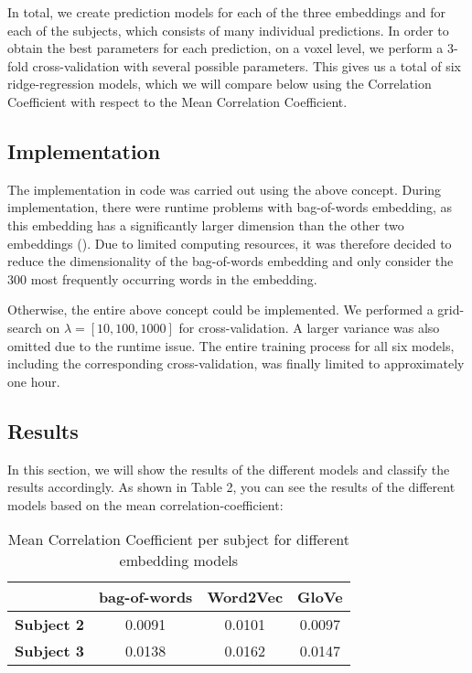\documentclass[12pt,letterpaper]{article}
\begin{document}
In total, we create prediction models for each of the three embeddings and for each of the subjects, which consists of many individual predictions. In order to obtain the best parameters for each prediction, on a voxel level, we perform a 3-fold cross-validation with several possible parameters. This gives us a total of six ridge-regression models, which we will compare below using the Correlation Coefficient with respect to the Mean Correlation Coefficient.


\subsection{Implementation}

The implementation in code was carried out using the above concept. During implementation, there were runtime problems with bag-of-words embedding, as this embedding has a significantly larger dimension than the other two embeddings (). Due to limited computing resources, it was therefore decided to reduce the dimensionality of the bag-of-words embedding and only consider the 300 most frequently occurring words in the embedding.

Otherwise, the entire above concept could be implemented. We performed a grid-search on $\lambda = [10, 100, 1000]$ for cross-validation. A larger variance was also omitted due to the runtime issue. The entire training process for all six models, including the corresponding cross-validation, was finally limited to approximately one hour.\\[0.2em]


\subsection{Results}

In this section, we will show the results of the different models and classify the results accordingly. As shown in Table 2, you can see the results of the different models based on the mean correlation-coefficient:

\begin{table}[H]
    \centering
    \begin{tabular}{l c c c}
        \hline
          & \textbf{bag-of-words} & \textbf{Word2Vec} & \textbf{GloVe} \\
        \hline
        \textbf{Subject 2} & 0.0091 & 0.0101 & 0.0097 \\
        \textbf{Subject 3} & 0.0138 & 0.0162 & 0.0147 \\
        \hline
    \end{tabular}
    \caption{Mean Correlation Coefficient per subject for different embedding models}
    \label{tab:accuracy_values}
\end{table}
\end{document}
